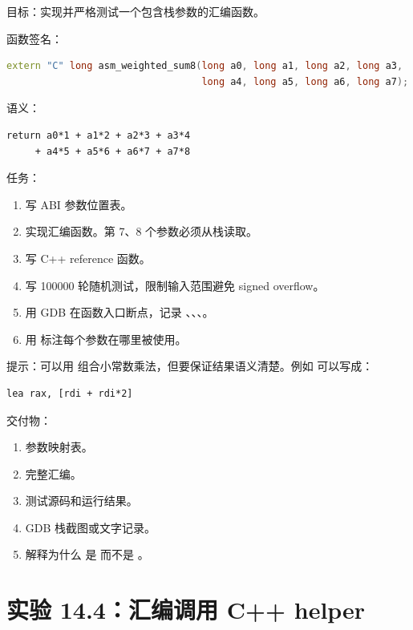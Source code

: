 \begin{labbox}
目标：实现并严格测试一个包含栈参数的汇编函数。

函数签名：

\begin{lstlisting}[language=C++]
extern "C" long asm_weighted_sum8(long a0, long a1, long a2, long a3,
                                  long a4, long a5, long a6, long a7);
\end{lstlisting}

语义：

\begin{lstlisting}
return a0*1 + a1*2 + a2*3 + a3*4
     + a4*5 + a5*6 + a6*7 + a7*8
\end{lstlisting}

任务：

\begin{enumerate}
  \item 写 ABI 参数位置表。
  \item 实现汇编函数。第 7、8 个参数必须从栈读取。
  \item 写 C++ reference 函数。
  \item 写 100000 轮随机测试，限制输入范围避免 signed overflow。
  \item 用 GDB 在函数入口断点，记录 、\code{[rsp]}、\code{[rsp + 8]}、\code{[rsp + 16]}。
  \item 用  标注每个参数在哪里被使用。
\end{enumerate}

提示：可以用  组合小常数乘法，但要保证结果语义清楚。例如  可以写成：

\begin{lstlisting}
lea rax, [rdi + rdi*2]
\end{lstlisting}

交付物：

\begin{enumerate}
  \item 参数映射表。
  \item 完整汇编。
  \item 测试源码和运行结果。
  \item GDB 栈截图或文字记录。
  \item 解释为什么  是 \code{[rsp + 8]} 而不是 \code{[rsp]}。
\end{enumerate}
\end{labbox}

\section{实验 14.4：汇编调用 C++ helper}

